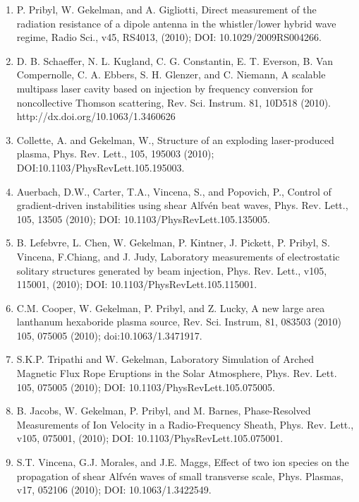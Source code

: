 \documentclass[11pt]{article}
\begin{document}
\begin{enumerate}
\item  P. Pribyl, W. Gekelman, and A. Gigliotti, Direct measurement of the radiation resistance of a dipole antenna in the whistler/lower hybrid wave regime, Radio Sci., v45, RS4013, (2010); DOI: 10.1029/2009RS004266.

\item  D. B. Schaeffer, N. L. Kugland, C. G. Constantin, E. T. Everson, B. Van Compernolle, C. A. Ebbers, S. H. Glenzer, and C. Niemann, A scalable multipass laser cavity based on injection by frequency conversion for noncollective Thomson scattering, Rev. Sci. Instrum. 81, 10D518 (2010).  http://dx.doi.org/10.1063/1.3460626

\item  Collette, A. and Gekelman, W., Structure of an exploding laser-produced plasma, Phys. Rev. Lett., 105, 195003 (2010); DOI:10.1103/PhysRevLett.105.195003.

\item  Auerbach, D.W., Carter, T.A., Vincena, S., and Popovich, P., Control of gradient-driven instabilities using shear Alfv\'{e}n beat waves, Phys. Rev. Lett., 105, 13505 (2010); DOI: 10.1103/PhysRevLett.105.135005.

\item  B. Lefebvre, L. Chen, W. Gekelman, P. Kintner, J. Pickett, P. Pribyl, S. Vincena, F.Chiang, and J. Judy, Laboratory measurements of electrostatic solitary structures generated by beam injection, Phys. Rev. Lett., v105, 115001, (2010); DOI: 10.1103/PhysRevLett.105.115001.

\item  C.M. Cooper, W. Gekelman, P. Pribyl, and Z. Lucky, A new large area lanthanum hexaboride plasma source, Rev. Sci. Instrum, 81, 083503 (2010) 105, 075005 (2010); doi:10.1063/1.3471917.

\item   S.K.P. Tripathi and W. Gekelman, Laboratory Simulation of Arched Magnetic Flux Rope Eruptions in the Solar Atmosphere, Phys. Rev. Lett. 105, 075005 (2010); DOI: 10.1103/PhysRevLett.105.075005.

\item   B. Jacobs, W. Gekelman, P. Pribyl, and M. Barnes, Phase-Resolved Measurements of Ion Velocity in a Radio-Frequency Sheath, Phys. Rev. Lett., v105, 075001, (2010); DOI: 10.1103/PhysRevLett.105.075001.

\item   S.T. Vincena, G.J. Morales, and J.E. Maggs, Effect of two ion species on the propagation of shear Alfv\'{e}n waves of small transverse scale, Phys. Plasmas, v17, 052106 (2010); DOI: 10.1063/1.3422549.


\end{enumerate}
\end{document}
